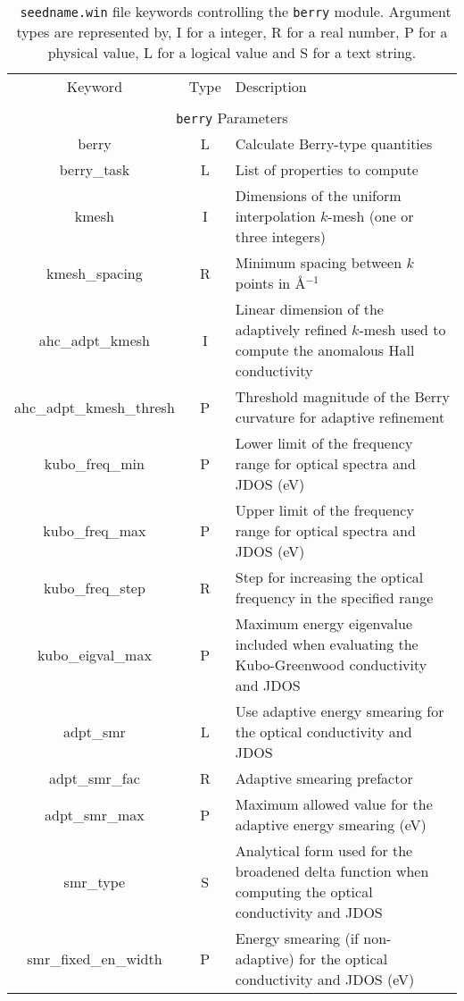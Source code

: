 \begin{table}[hH!]
\begin{center}
\begin{tabular}{|c|c|p{6cm}|}
  \hline
  Keyword & Type & Description \\
  &      &             \\
  \hline\hline
  \multicolumn{3}{|c|}{{\tt berry} Parameters} \\
  \hline
  {\sc berry}  & L & Calculate Berry-type quantities \\
  {\sc berry\_task}& L  & List of properties to compute \\
  {\sc [berry\_]kmesh} & I & Dimensions of the uniform interpolation $k$-mesh 
  (one or three integers)\\ 
  {\sc [berry\_]kmesh\_spacing}& R & Minimum spacing between $k$ points in 
  \AA$^{-1}$\\
  {\sc ahc\_adpt\_kmesh} & I & Linear dimension of the adaptively refined $k$-mesh used to compute the anomalous Hall conductivity\\ 
  {\sc ahc\_adpt\_kmesh\_thresh} & P & Threshold magnitude
  of the Berry curvature for adaptive refinement\\ 
  {\sc kubo\_freq\_min} & P & Lower limit of the frequency range for
  optical spectra and JDOS (eV) \\
  {\sc kubo\_freq\_max}& P & Upper limit of the frequency range for
  optical spectra and JDOS (eV) \\
  {\sc kubo\_freq\_step}& R &  Step for increasing
the optical frequency in the specified range\\
  {\sc kubo\_eigval\_max}& P &  Maximum energy eigenvalue
  included when evaluating the Kubo-Greenwood conductivity and JDOS\\
  {\sc [kubo\_]adpt\_smr} & L & Use adaptive energy smearing for the 
  optical conductivity and JDOS \\
  {\sc [kubo\_]adpt\_smr\_fac} & R & Adaptive smearing prefactor \\
  {\sc[kubo\_]adpt\_smr\_max} & P & Maximum allowed value for the 
  adaptive energy smearing (eV) \\
  {\sc [kubo\_]smr\_type} & S & Analytical form used for the broadened delta function
  when computing the optical conductivity and JDOS\\  
  {\sc [kubo\_]smr\_fixed\_en\_width} & P  & Energy smearing (if non-adaptive)
  for the optical conductivity and JDOS (eV) \\
  \hline
\end{tabular}
\caption[Parameter file keywords controlling the Berry module.]  {{\tt
    seedname.win} file keywords controlling the {\tt berry}
  module. Argument types are represented by, I for a integer, R for a
  real number, P for a physical value, L for a logical value and S for
  a text string.}
\label{parameter_keywords_berry}
\end{center}
\end{table}



